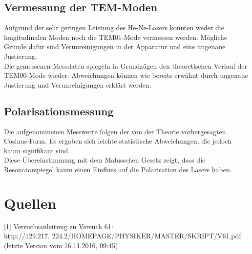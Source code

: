 \documentclass[]{scrartcl}
\begin{document}
\subsection{Vermessung der TEM-Moden}
Aufgrund der sehr geringen Leistung des He-Ne-Lasers konnten weder die longitudinalen Moden noch die TEM01-Mode vermessen werden. Mögliche Gründe dafür sind Verunreinigungen in der Apparatur und eine ungenaue Justierung. \\
Die gemessenen Messdaten spiegeln in Grundzügen den theoretischen Verlauf der TEM00-Mode wieder. Abweichungen können wie bereits erwähnt durch ungenaue Justierung und Verunreinigungen erklärt werden. 

\subsection{Polarisationsmessung}
Die aufgenommenen Messwerte folgen der von der Theorie vorhergesagten Cosinus-Form. Es ergaben sich leichte statistische Abweichungen, die jedoch kaum signifikant sind. \\
Diese Übereinstimmung mit dem Malusschen Gesetz zeigt, dass die Resonatorspiegel kaum einen Einfluss auf die Polarisation des Lasers haben.

\section{Quellen}
{[1]} Versuchsanleitung zu Versuch 61: \\
http://129.217.
224.2/HOMEPAGE/PHYSIKER/MASTER/SKRIPT/V61.pdf (letzte Version vom 16.11.2016, 09:45)\\
\end{document}
